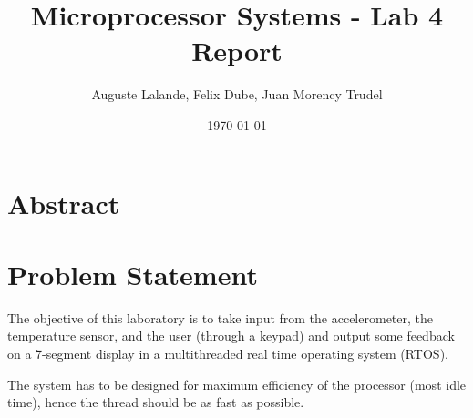\documentclass[12pt]{article}
\title{Microprocessor Systems - Lab 4 Report}
\author{Auguste Lalande, Felix Dube, Juan Morency Trudel}
\date{\today}
\begin{document}
\maketitle
\clearpage

\tableofcontents
\clearpage

\section{Abstract}


\section{Problem Statement}
The objective of this laboratory is to take input from the accelerometer, the temperature sensor, and the user (through a keypad) and output some feedback on a 7-segment display in a multithreaded real time operating system (RTOS). 

The system has to be designed for maximum efficiency of the processor (most idle time), hence the thread should be as fast as possible.
\end{document}
